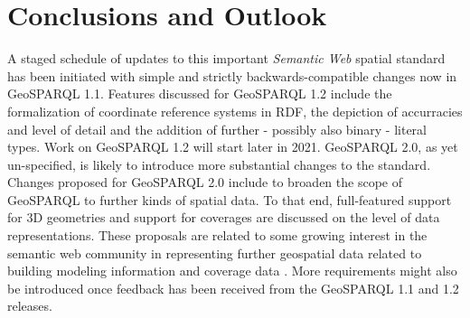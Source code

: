\documentclass[runningheads]{llncs}
\begin{document}
\section{Conclusions and Outlook}\label{sec:conclusions}
A staged schedule of updates to this important \textit{Semantic Web} spatial standard has been initiated with simple and strictly backwards-compatible changes now in GeoSPARQL 1.1. Features discussed for GeoSPARQL 1.2 include the formalization of coordinate reference systems in RDF, the depiction of accurracies and level of detail and the addition of further - possibly also binary - literal types. Work on GeoSPARQL 1.2 will start later in 2021. GeoSPARQL 2.0, as yet un-specified, is likely to introduce more substantial changes to the standard. Changes proposed for GeoSPARQL 2.0 include to broaden the scope of GeoSPARQL to further kinds of spatial data. To that end, full-featured support for 3D geometries and support for coverages are discussed on the level of data representations. These proposals are related to some growing interest in the semantic web community in representing further geospatial data related to building modeling information \cite{zhang2018bimsparql} and coverage data \cite{homburg2020geosparql+}. More requirements might also be introduced once feedback has been received from the GeoSPARQL 1.1 and 1.2 releases.

%
%
%


%




\end{document}
